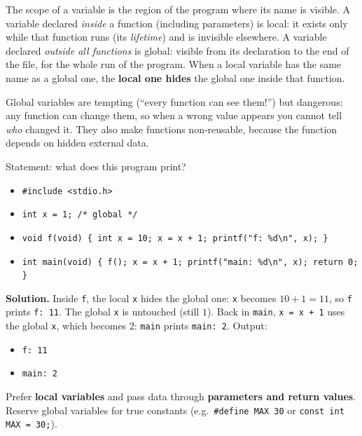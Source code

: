 \documentclass[11pt]{article}
\newcommand{\cle}[1]{{\popxbold\color{popdark}#1}}
\begin{document}
\begin{definition}
The \cle{scope} of a variable is the region of the program where its name is visible. A variable declared \emph{inside} a function (including parameters) is \cle{local}: it exists only while that function runs (its \emph{lifetime}) and is invisible elsewhere. A variable declared \emph{outside all functions} is \cle{global}: visible from its declaration to the end of the file, for the whole run of the program. When a local variable has the same name as a global one, the \textbf{local one hides} the global one inside that function.
\end{definition}

Global variables are tempting (``every function can see them!'') but dangerous: any function can change them, so when a wrong value appears you cannot tell \emph{who} changed it. They also make functions non-reusable, because the function depends on hidden external data.

\begin{exoresolu}
Statement: what does this program print?
\begin{itemize}
\item[] \texttt{\#include <stdio.h>}
\item[] \texttt{int x = 1;                 /* global */}
\item[] \texttt{void f(void) \{ int x = 10; x = x + 1; printf("f: \%d\textbackslash n", x); \}}
\item[] \texttt{int main(void) \{ f(); x = x + 1; printf("main: \%d\textbackslash n", x); return 0; \}}
\end{itemize}
\tcblower
\textbf{Solution.} Inside \texttt{f}, the local \texttt{x} hides the global one: \texttt{x} becomes $10+1=11$, so \texttt{f} prints \texttt{f: 11}. The global \texttt{x} is untouched (still $1$). Back in \texttt{main}, \texttt{x = x + 1} uses the global \texttt{x}, which becomes $2$: \texttt{main} prints \texttt{main: 2}. Output:
\begin{itemize}
\item[] \texttt{f: 11}
\item[] \texttt{main: 2}
\end{itemize}
\end{exoresolu}

\begin{aretenir}
Prefer \textbf{local variables} and pass data through \textbf{parameters and return values}. Reserve global variables for true constants (e.g.\ \texttt{\#define MAX 30} or \texttt{const int MAX = 30;}).
\end{aretenir}
\end{document}
